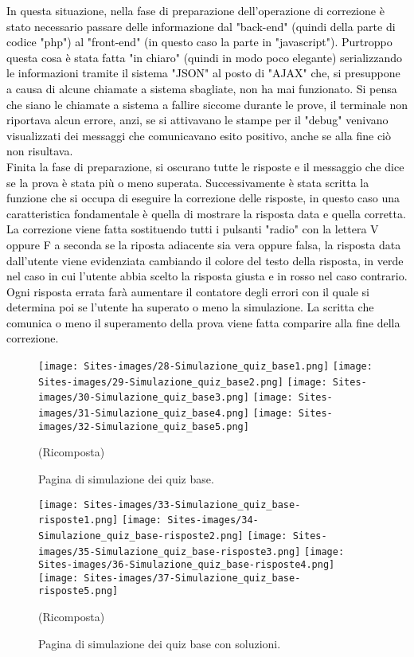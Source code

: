 \textcolor{black}{In questa situazione, nella fase di preparazione dell'operazione di correzione è stato necessario passare delle informazione dal "back-end" (quindi della parte di codice "php") al "front-end" (in questo caso la parte in "javascript"). Purtroppo questa cosa è stata fatta "in chiaro" (quindi in modo poco elegante) serializzando le informazioni tramite il sistema "JSON" al posto di "AJAX" che, si presuppone a causa di alcune chiamate a sistema sbagliate, non ha mai funzionato. Si pensa che siano le chiamate a sistema a fallire siccome durante le prove, il terminale non riportava alcun errore, anzi, se si attivavano le stampe per il "debug" venivano visualizzati dei messaggi che comunicavano esito positivo, anche se alla fine ciò non risultava.\\
Finita la fase di preparazione, si oscurano tutte le risposte e il messaggio che dice se la prova è stata più o meno superata. Successivamente è stata scritta la funzione che si occupa di eseguire la correzione delle risposte, in questo caso una caratteristica fondamentale è quella di mostrare la risposta data e quella corretta. La correzione viene fatta sostituendo tutti i pulsanti "radio" con la lettera V oppure F a seconda se la riposta adiacente sia vera oppure falsa, la risposta data dall'utente viene evidenziata cambiando il colore del testo della risposta, in verde nel caso in cui l'utente abbia scelto la risposta giusta e in rosso nel caso contrario. Ogni risposta errata farà aumentare il contatore degli errori con il quale si determina poi se l'utente ha superato o meno la simulazione. La scritta che comunica o meno il superamento della prova viene fatta comparire alla fine della correzione.}\\

\begin{figure}[h]
	\begin{center}
		\texttt{[image: Sites-images/28-Simulazione\_quiz\_base1.png]}
		\texttt{[image: Sites-images/29-Simulazione\_quiz\_base2.png]}
		\texttt{[image: Sites-images/30-Simulazione\_quiz\_base3.png]}
		\texttt{[image: Sites-images/31-Simulazione\_quiz\_base4.png]}
		\texttt{[image: Sites-images/32-Simulazione\_quiz\_base5.png]}
		\caption{Pagina di simulazione dei quiz base.}
		(Ricomposta)
	\end{center}
\end{figure}

\begin{figure}[h]
	\begin{center}
		\texttt{[image: Sites-images/33-Simulazione\_quiz\_base-risposte1.png]}
		\texttt{[image: Sites-images/34-Simulazione\_quiz\_base-risposte2.png]}
		\texttt{[image: Sites-images/35-Simulazione\_quiz\_base-risposte3.png]}
		\texttt{[image: Sites-images/36-Simulazione\_quiz\_base-risposte4.png]}
		\texttt{[image: Sites-images/37-Simulazione\_quiz\_base-risposte5.png]}
		\caption{Pagina di simulazione dei quiz base con soluzioni.}
		(Ricomposta)
	\end{center}
\end{figure}

